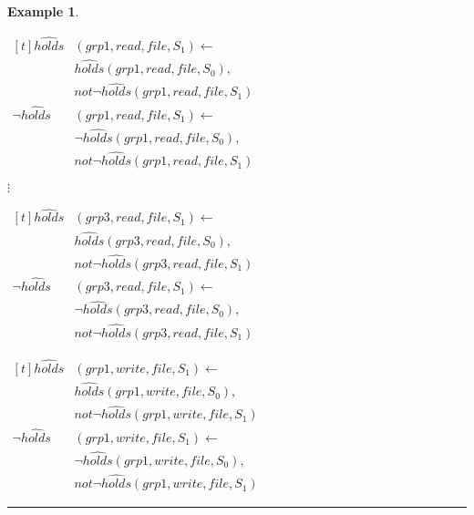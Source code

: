 \documentclass[11pt, twocolumn]{article}
\newtheorem{vexmpl}{Example}
\newenvironment{vexample}
  {\begin{vexmpl}\rm}
  {\rule{2mm}{2mm}\end{vexmpl}}
\begin{document}
\begin{vexample}
\begin{enumerate}
              \begin{math}
                \begin{aligned}[t]
                  \hat{holds}&(grp1, read, file, S_{1}) \leftarrow \\
                  & \hat{holds}(grp1, read, file, S_{0}), \\
                  & not \lnot \hat{holds}(grp1, read, file, S_{1}) \\
                  \lnot \hat{holds}&(grp1, read, file, S_{1}) \leftarrow \\
                  & \lnot \hat{holds}(grp1, read, file, S_{0}), \\
                  & not \lnot \hat{holds}(grp1, read, file, S_{1})
                \end{aligned}
              \end{math}

              \hspace{1cm} $\vdots$

              \begin{math}
                \begin{aligned}[t]
                  \hat{holds}&(grp3, read, file, S_{1}) \leftarrow \\
                  & \hat{holds}(grp3, read, file, S_{0}), \\
                  & not \lnot \hat{holds}(grp3, read, file, S_{1}) \\
                  \lnot \hat{holds}&(grp3, read, file, S_{1}) \leftarrow \\
                  & \lnot \hat{holds}(grp3, read, file, S_{0}), \\
                  & not \lnot \hat{holds}(grp3, read, file, S_{1})
                \end{aligned}
              \end{math}

              \begin{math}
                \begin{aligned}[t]
                  \hat{holds}&(grp1, write, file, S_{1}) \leftarrow \\
                  & \hat{holds}(grp1, write, file, S_{0}), \\
                  & not \lnot \hat{holds}(grp1, write, file, S_{1}) \\
                  \lnot \hat{holds}&(grp1, write, file, S_{1}) \leftarrow \\
                  & \lnot \hat{holds}(grp1, write, file, S_{0}), \\
                  & not \lnot \hat{holds}(grp1, write, file, S_{1})
                \end{aligned}
              \end{math}


\end{enumerate}
\end{vexample}
\end{document}
